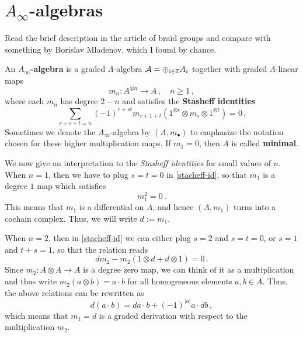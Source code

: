 
\section{$A_{\infty}$-algebras}

	Read the brief description in the article of braid groups and compare with
	something by Borislav Mladenov, which I found by chance.
	
	\begin{df}
		An \textbf{$A_{\infty}$-algebra} is a graded $\Lambda$-algebra $\mathcal{A} = \oplus_{i \in {\mathbb Z}} A_{i}$
		together with graded $\Lambda$-linear maps
		\begin{equation*}
			m_{n} : A^{\otimes n} \longrightarrow A\,, \quad n \ge 1\,,
		\end{equation*}
		where each $m_{n}$ has degree $2 - n$ and satisfies the \textbf{Stasheff identities}
		\begin{equation}\label{stacheff-id}
			\sum_{r+s+t=n} (-1)^{r+st} m_{r+1+t}(1^{\otimes r} \otimes m_{s} \otimes 1^{\otimes t}) = 0\,.
		\end{equation}
		Sometimes we denote the $A_{\infty}$-algebra by $(A,m_{\bullet})$
		to emphasize the notation chosen for these higher multiplication maps. 
		If $m_{1} = 0$, then $A$ is called \textbf{minimal}.
	\end{df}
	
	We now give an interpretation to the \emph{Stasheff identities} for small values of $n$.
	When $n=1$, then we have to plug $s=t=0$ in \eqref{stacheff-id}, 
	so that $m_{1}$ is a degree $1$ map which satisfies
	\begin{equation*}
		m_{1}^{2} = 0\,.
	\end{equation*}
	This means that $m_{1}$ is a differential on $A$, and hence $(A,m_{1})$
	turns into a cochain complex. Thus, we will write $d:=m_{1}$.
	
	When $n=2$, then in \eqref{stacheff-id} we can either plug $s=2$ and $s=t=0$,
	or $s=1$ and $t+s=1$, so that the relation reads
	\begin{equation*}
		dm_{2} - m_{2}(1 \otimes d + d \otimes 1) = 0\,.
	\end{equation*}
	Since $m_{2}:A \otimes A \to A$ is a degree zero map,
	we can think of it as a multiplication and thus write 
	$m_{2}(a \otimes b) = a \cdot b$ for all homogeneous elements $a, b \in A$.
	Thus, the above relations can be rewritten as
	\begin{equation*}
		d(a \cdot b) = da \cdot b + (-1)^{|a|} a \cdot db\,,
	\end{equation*}
	which means that $m_{1}=d$ is a graded derivation
	with respect to the multiplication $m_{2}$.
	
